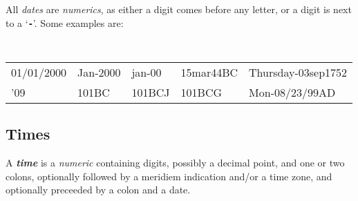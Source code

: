 \documentclass[12pt]{article}
\newcommand{\TT}[1]{{\tt \bfseries #1}}
\newcommand{\key}[1]{{\bf \em #1}\index{#1}}
\newenvironment{indpar}[1][0.3in]%
	{\begin{list}{}%
		     {\setlength{\itemsep}{0in}%
		      \setlength{\topsep}{0in}%
		      \setlength{\parsep}{1ex}%
		      \setlength{\labelwidth}{#1}%
		      \setlength{\leftmargin}{#1}%
		      \addtolength{\leftmargin}{\labelsep}}%
	 \item}%
	{\end{list}}
\begin{document}
All {\em dates} are {\em numerics}, as either a digit comes before
any letter, or a digit is next to a `\TT{-}'.  Some examples are:

\begin{indpar}[0.1in]
\tt
\begin{tabular}{@{}l@{~~}l@{~~}l@{~~}l@{~~}l@{}}
01/01/2000	& Jan-2000	 & jan-00	& 15mar44BC
						& Thursday-03sep1752 \\
'09		& 101BC		 & 101BCJ	& 101BCG
						& Mon-08/23/99AD \\
\end{tabular}
\end{indpar}

\subsection{Times}
\label{TIMES}

A \key{time} is a {\em numeric} containing digits, possibly a decimal
point, and one or two colons, optionally followed by a meridiem indication
and/or a time zone, and optionally preceeded by a colon and a date.
\end{document}
